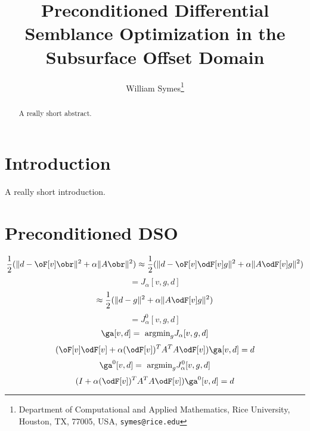 \title{Preconditioned Differential Semblance Optimization in the Subsurface Offset Domain}

\author{
William Symes\thanks{Department of Computational and Applied Mathematics, Rice University,
Houston, TX, 77005, USA,
{\tt symes@rice.edu}}
}



\maketitle
\parskip 12pt

\begin{abstract}
A really short abstract.
\end{abstract}

\section{Introduction} 
A really short introduction.





\section{Preconditioned DSO}

\[
 \frac{1}{2}(\|d-\oF[v]\obr\|^2 + \alpha \|A\obr\|^2) \approx 
\frac{1}{2}(\|d-\oF[v]\odF[v]g\|^2 + \alpha \|A \odF[v]g\|^2)
\]
\begin{equation}
\label{eqn:Jdef}
= J_{\alpha}[v,g,d] 
\end{equation}
\[
\approx \frac{1}{2}(\|d-g\|^2 +  \alpha \|A \odF[v]g\|^2)
\]
\begin{equation}
\label{eqn:Jdef}
= J^0_{\alpha}[v,g,d] 
\end{equation}
\[
\ga[v,d] = \mbox{ argmin}_{g} J_{\alpha}[v,g,d]
\]
\begin{equation}
\label{eqn:normal}
(\oF[v]\odF[v] + \alpha (\odF[v])^TA^TA\odF[v]) \ga[v,d]=d 
\end{equation}
\[
\ga^0[v,d] = \mbox{ argmin}_{g} J^0_{\alpha}[v,g,d]
\]
\begin{equation}
\label{eqn:normal0}
(I + \alpha (\odF[v])^TA^TA\odF[v]) \ga^0[v,d]=d 
\end{equation}


